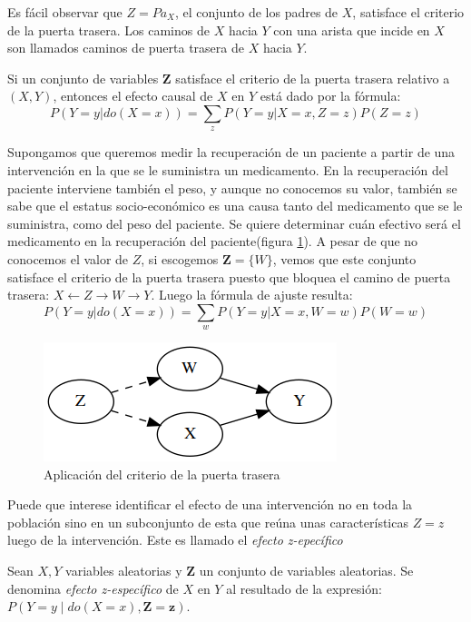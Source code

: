 Es fácil observar que $Z=Pa_X$, el conjunto de los padres de $X$, satisface el criterio de la puerta trasera. Los caminos de $X$ hacia $Y$ con una arista que incide en $X$ son llamados caminos de puerta trasera de $X$ hacia $Y$.

\begin{theorem}
	Si un conjunto de variables $\textbf{Z}$ satisface el criterio de la puerta trasera relativo a $(X,Y)$, entonces el efecto causal de $X$ en $Y$ está dado por la fórmula:
	\[ P(Y=y|do(X=x)) = \sum_{z} P(Y=y|X=x,Z=z)P(Z=z)\]
\end{theorem}

Supongamos que queremos medir la recuperación de un paciente a partir de una intervención en la que se le suministra un medicamento. En la recuperación del paciente interviene también el peso, y aunque no conocemos su valor, también se sabe que el estatus socio-económico es una causa tanto del medicamento que se le suministra, como del peso del paciente. Se quiere determinar cuán efectivo será el medicamento en la recuperación del paciente(figura \ref{fig:backdoor}).	A pesar de que no conocemos el valor de $Z$, si escogemos $\textbf{Z}=\{W\}$, vemos que este conjunto satisface el criterio de la puerta trasera puesto que bloquea el camino de puerta trasera: $X \leftarrow Z \rightarrow W \rightarrow Y$. Luego la fórmula de ajuste resulta:
\[ P(Y=y|do(X=x)) = \sum_{w} P(Y=y|X=x,W=w)P(W=w)\]

\begin{figure}[!h]
	\centering
	\includegraphics[width=0.35\linewidth]{images/Chapter 2/backdoor-ex.png}
	\caption{Aplicación del criterio de la puerta trasera}
	\label{fig:backdoor}
\end{figure}

Puede que interese identificar el efecto de una intervención no en toda la población sino en un subconjunto de esta que reúna unas características $Z=z$ luego de la intervención. Este es llamado el \textit{efecto z-epecífico}

\begin{dfn}
	Sean $X,Y$ variables aleatorias y $\textbf{Z}$ un conjunto de variables aleatorias. Se denomina \textit{efecto z-específico} de $X$ en $Y$ al resultado de la expresión: $P(Y=y \mid do(X=x), \textbf{Z}=\textbf{z})$.
\end{dfn}

